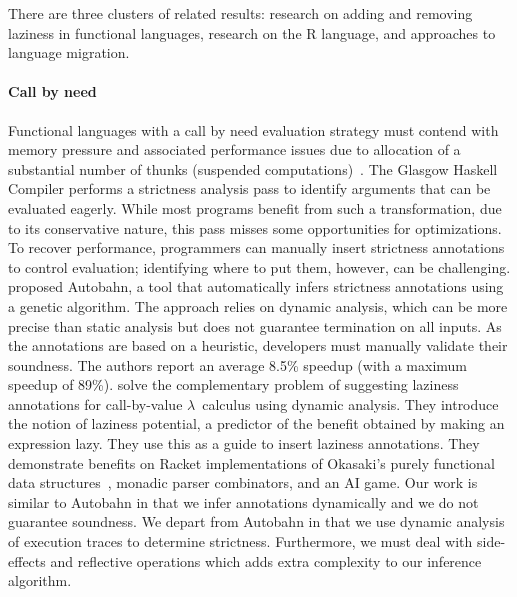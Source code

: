 \documentclass[review,creen,acmsmall]{acmart}
\begin{document}
There are three clusters of related results: research on adding and removing
laziness in functional languages, research on the R language, and approaches to
language migration.

\paragraph{Call by need}  Functional languages with
a call by need evaluation strategy must contend with memory pressure and
associated performance issues due to allocation of a substantial number of
thunks (suspended computations)~\cite{transformopt,stricteffective,opteval}. The
Glasgow Haskell Compiler performs a strictness analysis pass to identify
arguments that can be evaluated eagerly. While most programs benefit from such a
transformation, due to its conservative nature, this pass misses some
opportunities for optimizations. To recover performance, programmers can
manually insert strictness annotations to control evaluation; identifying where
to put them, however, can be challenging. \citet{autobahn} proposed Autobahn, a
tool that automatically infers strictness annotations using a genetic algorithm.
The approach relies on dynamic analysis, which can be more precise than static
analysis but does not guarantee termination on all inputs. As the annotations
are based on a heuristic, developers must manually validate their soundness. The
authors report an average 8.5\% speedup (with a maximum speedup of 89\%).
\citet{lazyprof} solve the complementary problem of suggesting laziness
annotations for call-by-value $\lambda$~calculus using dynamic analysis. They
introduce the notion of laziness potential, a predictor of the benefit obtained
by making an expression lazy. They use this as a guide to insert laziness
annotations. They demonstrate benefits on Racket implementations of Okasaki's
purely functional data structures~\cite{oka95}, monadic parser combinators, and
an AI game. Our work is similar to Autobahn in that we infer annotations
dynamically and we do not guarantee soundness. We depart from Autobahn in that
we use dynamic analysis of execution traces to determine strictness.
Furthermore, we must deal with side-effects and reflective operations which adds
extra complexity to our inference algorithm.
\end{document}
